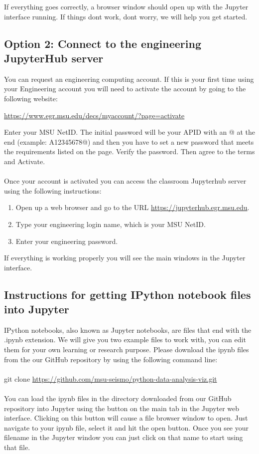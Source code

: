 \documentclass[12pt]{article}   	%
\begin{document}
If everything goes correctly, a browser window should open up with the Jupyter interface running. If things don\textquotesingle t work, don\textquotesingle t worry, we will help you get started.

\subsection*{Option 2: Connect to the engineering JupyterHub server}
You can request an engineering computing account. If this is your first time using your Engineering account you will need to activate the account by
going to the following website: 
\begin{center}
\href{https://www.egr.msu.edu/decs/myaccount/?page=activate}{https://www.egr.msu.edu/decs/myaccount/?page=activate} 
\end{center}
Enter your MSU NetID. The initial password will be your APID with an @ at the end (example: A12345678@) and then you have to set a new password that meets the
requirements listed on the page. Verify the password. Then agree to the terms and Activate. \\ \\
Once your account is activated you can access the classroom Jupyterhub server using the following instructions:
\begin{enumerate}[noitemsep]
\item Open up a web browser and go to the URL \href{https://jupyterhub.egr.msu.edu}{https://jupyterhub.egr.msu.edu}.
\item Type your engineering login name, which is your MSU NetID.
\item Enter your engineering password.
\end{enumerate}
If everything is working properly you will see the main  windows in the Jupyter interface.


\subsection*{Instructions for getting IPython notebook files into Jupyter}
IPython notebooks, also known as Jupyter notebooks, are files that end with the .ipynb extension. We will give you two example files to work with, you can edit them for your own learning or research 
purpose. Please download the ipynb files from the our GitHub repository by using the following command line: \\\\
git clone \href{https://github.com/msu-seismo/python-data-analysis-viz.git}{https://github.com/msu-seismo/python-data-analysis-viz.git} \\\\
You can load the ipynb files in the directory downloaded from our GitHub repository into Jupyter using the
 button on the main  tab in the Jupyter web interface. Clicking on this button will
cause a file browser window to open. Just navigate to your ipynb file, select it and hit the
open button. Once you see your filename in the Jupyter window you can just click on that
name to start using that file. 
\end{document}
